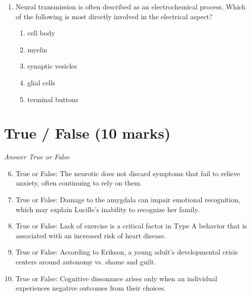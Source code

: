 \documentclass[12pt]{article}
\begin{document}
\begin{enumerate}[label=\arabic*.]
\begin{enumerate}[label=(\alph*)]
    \item Triarchic theory of intelligence
    \item Multiple intelligences theory
    \item Cognitive development theory
    \item The positive manifold
    \item G theory
\end{enumerate}
\item Neural transmission is often described as an electrochemical process. Which of the following is most directly involved in the electrical aspect?
\begin{enumerate}[label=(\alph*)]
    \item cell body
    \item myelin
    \item synaptic vesicles
    \item glial cells
    \item terminal buttons
\end{enumerate}
\end{enumerate}

\section*{True / False (10 marks)}
\textit{Answer True or False}
\begin{enumerate}[label=\arabic*.]
\setcounter{enumi}{5}
\item True or False: The neurotic does not discard symptoms that fail to relieve anxiety, often continuing to rely on them.
\item True or False: Damage to the amygdala can impair emotional recognition, which may explain Lucille's inability to recognize her family.
\item True or False: Lack of exercise is a critical factor in Type A behavior that is associated with an increased risk of heart disease.
\item True or False: According to Erikson, a young adult's developmental crisis centers around autonomy vs. shame and guilt.
\item True or False: Cognitive dissonance arises only when an individual experiences negative outcomes from their choices.
\end{enumerate}
\end{document}
